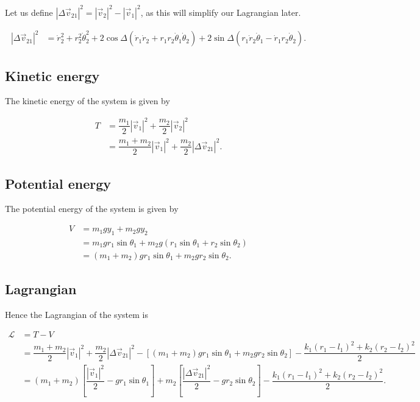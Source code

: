 \documentclass[12pt,a4paper,portrait]{article}
\newcommand{\lag}{\mathcal{L}}
\begin{document}
\begin{landscape}
Let us define $|\Delta \vec{v}_{21}|^2 = |\vec{v}_2|^2 - |\vec{v}_1|^2$, as this will simplify our Lagrangian later.

\begin{align*}
	|\Delta \vec{v}_{21}|^2 &= \dot{r}_2^2 + r_2^2\dot{\theta}_2^2 + 2\cos{\Delta}(\dot{r}_1\dot{r}_2 + r_1r_2\dot{\theta}_1\dot{\theta}_2) + 2\sin{\Delta}(r_1\dot{r}_2\dot{\theta}_1-\dot{r}_1r_2\dot{\theta}_2).
\end{align*}

\subsection{Kinetic energy}
The kinetic energy of the system is given by

\begin{align*}
	T &= \dfrac{m_1}{2}|\vec{v}_1|^2 + \dfrac{m_2}{2}|\vec{v}_2|^2 \\
	&= \dfrac{m_1+m_2}{2}|\vec{v}_1|^2 + \dfrac{m_2}{2}|\Delta \vec{v}_{21}|^2.
\end{align*}

\subsection{Potential energy}
The potential energy of the system is given by

\begin{align*}
	V &= m_1 gy_1 + m_2gy_2 \\
	&= m_1 gr_1\sin{\theta_1} + m_2g(r_1\sin{\theta_1} + r_2\sin{\theta_2}) \\
	&= (m_1+m_2)gr_1\sin{\theta_1} + m_2gr_2\sin{\theta_2}.
\end{align*}

\subsection{Lagrangian}
Hence the Lagrangian of the system is

\begin{align*}
	\lag &= T - V \\
	&= \dfrac{m_1+m_2}{2}|\vec{v}_1|^2 + \dfrac{m_2}{2}|\Delta \vec{v}_{21}|^2 - \left[(m_1+m_2)gr_1\sin{\theta_1} + m_2gr_2\sin{\theta_2}\right] - \dfrac{k_1(r_1-l_1)^2+k_2(r_2-l_2)^2}{2} \\
	&= (m_1+m_2)\left[\dfrac{|\vec{v}_1|^2}{2} - gr_1\sin{\theta_1}\right] + m_2\left[\dfrac{|\Delta \vec{v}_{21}|^2}{2} - gr_2\sin{\theta_2}\right]  - \dfrac{k_1(r_1-l_1)^2+k_2(r_2-l_2)^2}{2}.
\end{align*}


\end{landscape}
\end{document}
